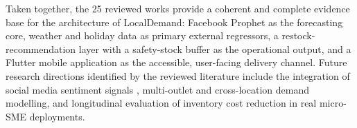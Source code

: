 \documentclass[conference]{IEEEtran}
\begin{document}
Taken together, the 25 reviewed works provide a coherent and complete
evidence base for the architecture of LocalDemand: Facebook Prophet
as the forecasting core, weather and holiday data as primary external
regressors, a restock-recommendation layer with a safety-stock buffer
as the operational output, and a Flutter mobile application as the
accessible, user-facing delivery channel. Future research directions
identified by the reviewed literature include the integration of social
media sentiment signals \cite{aidpaf}, multi-outlet and cross-location
demand modelling, and longitudinal evaluation of inventory cost
reduction in real micro-SME deployments.

\end{document}
